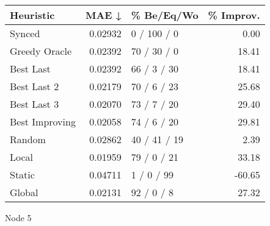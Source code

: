 \begin{tabular}{lrlr}
\toprule
\textbf{Heuristic} & \textbf{MAE ↓} & \textbf{\% Be/Eq/Wo} & \textbf{\% Improv.} \\
\midrule
            Synced &        0.02932 &          0 / 100 / 0 &                0.00 \\
     Greedy Oracle &        0.02392 &          70 / 30 / 0 &               18.41 \\
         Best Last &        0.02392 &          66 / 3 / 30 &               18.41 \\
       Best Last 2 &        0.02179 &          70 / 6 / 23 &               25.68 \\
       Best Last 3 &        0.02070 &          73 / 7 / 20 &               29.40 \\
    Best Improving &        0.02058 &          74 / 6 / 20 &               29.81 \\
            Random &        0.02862 &         40 / 41 / 19 &                2.39 \\
             Local &        0.01959 &          79 / 0 / 21 &               33.18 \\
            Static &        0.04711 &           1 / 0 / 99 &              -60.65 \\
            Global &        0.02131 &           92 / 0 / 8 &               27.32 \\
\bottomrule
\end{tabular}
\caption{Node 5}
\label{tab:non_lr01_le1_bs2_5}
